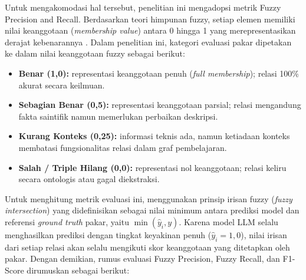 \documentclass[main]{subfiles}
\begin{document}
Untuk mengakomodasi hal tersebut, penelitian ini mengadopsi metrik Fuzzy
Precision and Recall. Berdasarkan teori himpunan fuzzy, setiap elemen
memiliki nilai keanggotaan (\textit{membership value}) antara 0 hingga 1
yang merepresentasikan derajat kebenarannya \parencite{harju_evaluating_2023}.
Dalam penelitian ini, kategori evaluasi pakar dipetakan ke dalam nilai
keanggotaan fuzzy sebagai berikut:

\begin{itemize}
  \item \textbf{Benar (1,0):} representasi keanggotaan penuh
        (\textit{full membership}); relasi 100\% akurat secara keilmuan.
  \item \textbf{Sebagian Benar (0,5):} representasi keanggotaan parsial;
        relasi mengandung fakta saintifik namun memerlukan perbaikan
        deskripsi.
  \item \textbf{Kurang Konteks (0,25):} informasi teknis ada, namun
        ketiadaan konteks membatasi fungsionalitas relasi dalam graf
        pembelajaran.
  \item \textbf{Salah / Triple Hilang (0,0):} representasi nol
        keanggotaan; relasi keliru secara ontologis atau gagal
        diekstraksi.
\end{itemize}

Untuk menghitung metrik evaluasi ini, \textcite{harju_evaluating_2023} menggunakan
prinsip irisan fuzzy (\textit{fuzzy intersection}) yang didefinisikan
sebagai nilai minimum antara prediksi model dan referensi
\textit{ground truth} pakar, yaitu $\min(\hat{y}_i, y)$. Karena model
LLM selalu menghasilkan prediksi dengan tingkat keyakinan penuh
($\hat{y}_i = 1{,}0$), nilai irisan dari setiap relasi akan selalu
mengikuti skor keanggotaan yang ditetapkan oleh pakar. Dengan demikian,
rumus evaluasi Fuzzy Precision, Fuzzy Recall, dan F1-Score dirumuskan
sebagai berikut:
\end{document}
